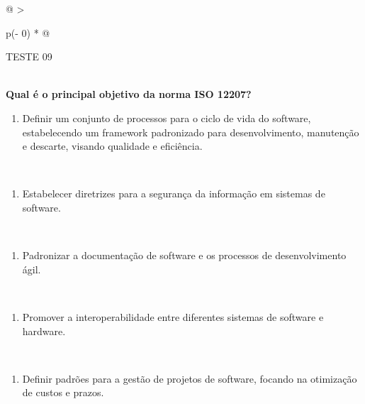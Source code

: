 \documentclass[
]{book}
\providecommand{\tightlist}{%
  \setlength{\itemsep}{0pt}\setlength{\parskip}{0pt}}
\begin{document}
\begin{longtable}[]{@{}
  >{\raggedright\arraybackslash}p{(\columnwidth - 0\tabcolsep) * }@{}}
\toprule\noalign{}
\begin{minipage}[b]{\linewidth}\raggedright
TESTE 09
\end{minipage} \\
\midrule\noalign{}
\endhead
\bottomrule\noalign{}
\endlastfoot
\textbf{Qual é o principal objetivo da norma ISO 12207?} \\
\begin{minipage}[t]{\linewidth}\raggedright
\begin{enumerate}
\def\labelenumi{\alph{enumi})}
\tightlist
\item
  Definir um conjunto de processos para o ciclo de vida do software, estabelecendo um framework padronizado para desenvolvimento, manutenção e descarte, visando qualidade e eficiência.
\end{enumerate}
\end{minipage} \\
\begin{minipage}[t]{\linewidth}\raggedright
\begin{enumerate}
\def\labelenumi{\alph{enumi})}
\setcounter{enumi}{1}
\tightlist
\item
  Estabelecer diretrizes para a segurança da informação em sistemas de software.
\end{enumerate}
\end{minipage} \\
\begin{minipage}[t]{\linewidth}\raggedright
\begin{enumerate}
\def\labelenumi{\alph{enumi})}
\setcounter{enumi}{2}
\tightlist
\item
  Padronizar a documentação de software e os processos de desenvolvimento ágil.
\end{enumerate}
\end{minipage} \\
\begin{minipage}[t]{\linewidth}\raggedright
\begin{enumerate}
\def\labelenumi{\alph{enumi})}
\setcounter{enumi}{3}
\tightlist
\item
  Promover a interoperabilidade entre diferentes sistemas de software e hardware.
\end{enumerate}
\end{minipage} \\
\begin{minipage}[t]{\linewidth}\raggedright
\begin{enumerate}
\def\labelenumi{\alph{enumi})}
\setcounter{enumi}{4}
\tightlist
\item
  Definir padrões para a gestão de projetos de software, focando na otimização de custos e prazos.
\end{enumerate}
\end{minipage} \\
\end{longtable}
\end{document}

